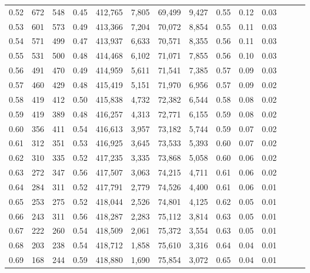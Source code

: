 \begin{tabular}{rrrrrrrrrrrrrr}
0.52 &     672 &    548 &  0.45 &  412,765 &    7,805 &  69,499 &   9,427 &  0.55 &  0.12 &      0.03 \\
0.53 &     601 &    573 &  0.49 &  413,366 &    7,204 &  70,072 &   8,854 &  0.55 &  0.11 &      0.03 \\
0.54 &     571 &    499 &  0.47 &  413,937 &    6,633 &  70,571 &   8,355 &  0.56 &  0.11 &      0.03 \\
0.55 &     531 &    500 &  0.48 &  414,468 &    6,102 &  71,071 &   7,855 &  0.56 &  0.10 &      0.03 \\
0.56 &     491 &    470 &  0.49 &  414,959 &    5,611 &  71,541 &   7,385 &  0.57 &  0.09 &      0.03 \\
0.57 &     460 &    429 &  0.48 &  415,419 &    5,151 &  71,970 &   6,956 &  0.57 &  0.09 &      0.02 \\
0.58 &     419 &    412 &  0.50 &  415,838 &    4,732 &  72,382 &   6,544 &  0.58 &  0.08 &      0.02 \\
0.59 &     419 &    389 &  0.48 &  416,257 &    4,313 &  72,771 &   6,155 &  0.59 &  0.08 &      0.02 \\
0.60 &     356 &    411 &  0.54 &  416,613 &    3,957 &  73,182 &   5,744 &  0.59 &  0.07 &      0.02 \\
0.61 &     312 &    351 &  0.53 &  416,925 &    3,645 &  73,533 &   5,393 &  0.60 &  0.07 &      0.02 \\
0.62 &     310 &    335 &  0.52 &  417,235 &    3,335 &  73,868 &   5,058 &  0.60 &  0.06 &      0.02 \\
0.63 &     272 &    347 &  0.56 &  417,507 &    3,063 &  74,215 &   4,711 &  0.61 &  0.06 &      0.02 \\
0.64 &     284 &    311 &  0.52 &  417,791 &    2,779 &  74,526 &   4,400 &  0.61 &  0.06 &      0.01 \\
0.65 &     253 &    275 &  0.52 &  418,044 &    2,526 &  74,801 &   4,125 &  0.62 &  0.05 &      0.01 \\
0.66 &     243 &    311 &  0.56 &  418,287 &    2,283 &  75,112 &   3,814 &  0.63 &  0.05 &      0.01 \\
0.67 &     222 &    260 &  0.54 &  418,509 &    2,061 &  75,372 &   3,554 &  0.63 &  0.05 &      0.01 \\
0.68 &     203 &    238 &  0.54 &  418,712 &    1,858 &  75,610 &   3,316 &  0.64 &  0.04 &      0.01 \\
0.69 &     168 &    244 &  0.59 &  418,880 &    1,690 &  75,854 &   3,072 &  0.65 &  0.04 &      0.01 \\

\end{tabular}
